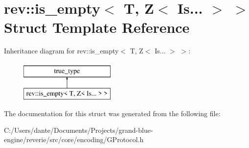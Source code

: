 \hypertarget{structrev_1_1is__empty_3_01_t_00_01_z_3_01_is_8_8_8_01_4_01_4}{}\section{rev\+::is\+\_\+empty$<$ T, Z$<$ Is... $>$ $>$ Struct Template Reference}
\label{structrev_1_1is__empty_3_01_t_00_01_z_3_01_is_8_8_8_01_4_01_4}
Inheritance diagram for rev\+::is\+\_\+empty$<$ T, Z$<$ Is... $>$ $>$\+:\begin{figure}[H]
\begin{center}
\leavevmode
\includegraphics[height=2.000000cm]{structrev_1_1is__empty_3_01_t_00_01_z_3_01_is_8_8_8_01_4_01_4}
\end{center}
\end{figure}


The documentation for this struct was generated from the following file\+:\begin{DoxyCompactItemize}
\item 
C\+:/\+Users/dante/\+Documents/\+Projects/grand-\/blue-\/engine/reverie/src/core/encoding/G\+Protocol.\+h\end{DoxyCompactItemize}
